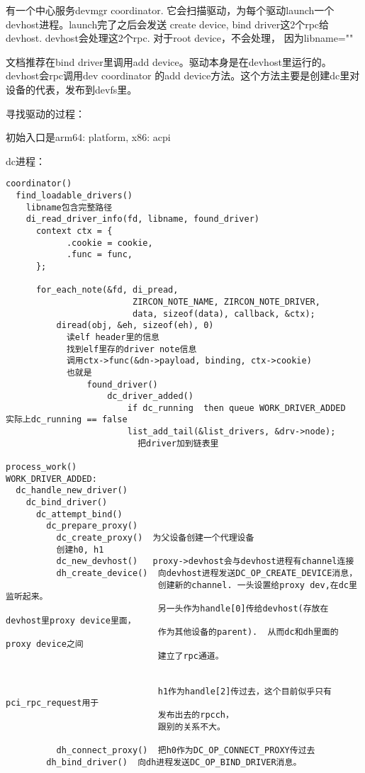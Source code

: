 有一个中心服务devmgr coordinator. 它会扫描驱动，为每个驱动launch一个devhost进程。launch完了之后会发送
create device, bind driver这2个rpc给devhost. devhost会处理这2个rpc. 对于root device，不会处理，
因为libname=""

文档推荐在bind driver里调用add device。驱动本身是在devhost里运行的。devhost会rpc调用dev coordinator
的add device方法。这个方法主要是创建dc里对设备的代表，发布到devfs里。


寻找驱动的过程：

初始入口是arm64: platform, x86: acpi

dc进程：
\begin{verbatim}
coordinator()
  find_loadable_drivers()
    libname包含完整路径
    di_read_driver_info(fd, libname, found_driver)
      context ctx = {
            .cookie = cookie,
            .func = func,
      };

      for_each_note(&fd, di_pread,
                         ZIRCON_NOTE_NAME, ZIRCON_NOTE_DRIVER,
                         data, sizeof(data), callback, &ctx);
          diread(obj, &eh, sizeof(eh), 0)
            读elf header里的信息
            找到elf里存的driver note信息
            调用ctx->func(&dn->payload, binding, ctx->cookie)
            也就是
                found_driver()
                    dc_driver_added()
                        if dc_running  then queue WORK_DRIVER_ADDED  实际上dc_running == false
                        list_add_tail(&list_drivers, &drv->node);
                          把driver加到链表里

process_work()
WORK_DRIVER_ADDED:
  dc_handle_new_driver()
    dc_bind_driver()
      dc_attempt_bind()
        dc_prepare_proxy()
          dc_create_proxy()  为父设备创建一个代理设备
          创建h0, h1
          dc_new_devhost()   proxy->devhost会与devhost进程有channel连接
          dh_create_device()  向devhost进程发送DC_OP_CREATE_DEVICE消息，
                              创建新的channel. 一头设置给proxy dev,在dc里监听起来。
                              另一头作为handle[0]传给devhost(存放在devhost里proxy device里面，
                              作为其他设备的parent).  从而dc和dh里面的proxy device之间
                              建立了rpc通道。


                              h1作为handle[2]传过去，这个目前似乎只有pci_rpc_request用于
                              发布出去的rpcch，
                              跟别的关系不大。

          dh_connect_proxy()  把h0作为DC_OP_CONNECT_PROXY传过去
        dh_bind_driver()  向dh进程发送DC_OP_BIND_DRIVER消息。


\end{verbatim}

